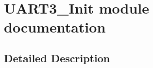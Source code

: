 \hypertarget{group___u_a_r_t3___init__module}{}\section{U\+A\+R\+T3\+\_\+\+Init module documentation}
\label{group___u_a_r_t3___init__module}


\subsection{Detailed Description}
